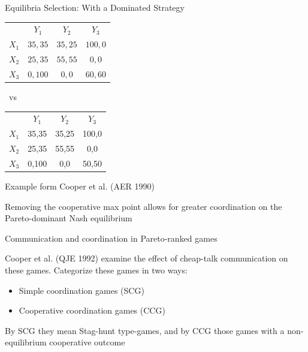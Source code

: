 \documentclass{beamer}
\begin{document}
\begin{frame}{Equilibria Selection: With a Dominated Strategy}
\begin{card}
	\begin{center}{\footnotesize 
		\begin{tabular}{r|c|c|c|}
			\multicolumn{1}{r}{ }& \multicolumn{1}{c}{$Y_1$}  & \multicolumn{1}{c}{$Y_2$} & \multicolumn{1}{c}{$Y_3$} \\ \cline{2-4}
			$X_1$ &  $35,35$  & $35,25$  & $100,0$ \\ \cline{2-4}
			$X_2$ &  $25,35$  & $55,55$  & $0,0$   \\ \cline{2-4}
			$X_3$ &  $0,100$  & $0,0$    & $60,60$  \\ \cline{2-4}
		\end{tabular}\ vs\ \begin{tabular}{r|c|c|c|}
			\multicolumn{1}{r}{ }& \multicolumn{1}{c}{$Y_1$}  & \multicolumn{1}{c}{$Y_2$} & \multicolumn{1}{c}{$Y_3$} \\ \cline{2-4}
			$X_1$ &  35,35 & 35,25  & 100,0 \\ \cline{2-4}
			$X_2$ &  25,35 & 55,55  & 0,0 \\ \cline{2-4}
			$X_3$ &  0,100 & 0,0  & 50,50  \\ \cline{2-4}
		\end{tabular}
		}
	\end{center}
\end{card}	
\begin{card}Example form Cooper et al. (AER 1990)

 Removing the cooperative max point allows for greater coordination on the Pareto-dominant Nash equilibrium
\end{card}
\end{frame}

\begin{frame}{Communication and coordination in Pareto-ranked games}
	\begin{card}
 Cooper et al. (QJE 1992) examine the effect of cheap-talk communication on these games. Categorize these games in two ways:
			\begin{itemize}
				\item Simple coordination games (SCG)
				\item Cooperative coordination games (CCG)
			\end{itemize}
 By SCG they mean Stag-hunt type-games, and by CCG those games with a non-equilibrium cooperative outcome
	\end{card}
\end{frame}
\end{document}
